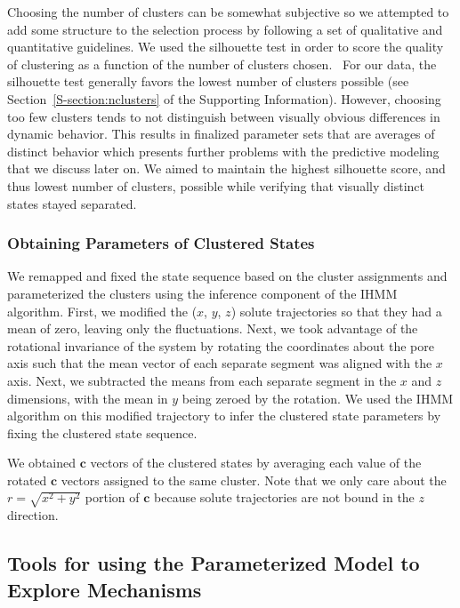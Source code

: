 \documentclass[journal=jpcbfk,manuscript=article]{achemso}
\begin{document}
  Choosing the number of clusters can be somewhat subjective so
  we attempted to add some structure to the selection process by following
  a set of qualitative and quantitative guidelines. We used the silhouette 
  test in order to score the quality of clustering as a function of the number 
  of clusters chosen.~\cite{kaufman_finding_2009} For our data, the silhouette 
  test generally favors the lowest number of clusters possible (see 
  Section~\ref{S-section:nclusters} of the Supporting Information). However, 
  choosing too few clusters tends to not distinguish between visually obvious 
  differences in dynamic behavior. This results in finalized parameter sets 
  that are averages of distinct behavior which presents further problems with 
  the predictive modeling that we discuss later on. We aimed to maintain the 
  highest silhouette score, and thus lowest number of clusters, possible while
  verifying that visually distinct states stayed separated. 

  \subsubsection*{Obtaining Parameters of Clustered States}
  

  We remapped and fixed the state sequence based on
  the cluster assignments and parameterized the clusters using the
  inference component of the IHMM algorithm.  First, we modified the
  ($x$, $y$, $z$) solute trajectories so that they had a mean of zero,
  leaving only the fluctuations. Next, we took advantage of the
  rotational invariance of the system by rotating the
  coordinates about the pore axis such that the mean vector of each
  separate segment was aligned with the $x$ axis. Next, we subtracted
  the means from each separate segment in the $x$ and $z$ dimensions,
  with the mean in $y$ being zeroed by the rotation.  We used the IHMM
  algorithm on this modified trajectory to infer the clustered state
  parameters by fixing the clustered state sequence.
  
  We obtained $\mathbf{c}$ vectors of the clustered states by averaging 
  each value of the rotated $\mathbf{c}$ vectors assigned to the same cluster. Note
  that we only care about the $r=\sqrt{x^2+y^2}$ portion of $\mathbf{c}$ because solute 
  trajectories are not bound in the $z$ direction.

  \subsection{Tools for using the Parameterized Model to Explore Mechanisms}\label{method:interactions}
  
\end{document}
